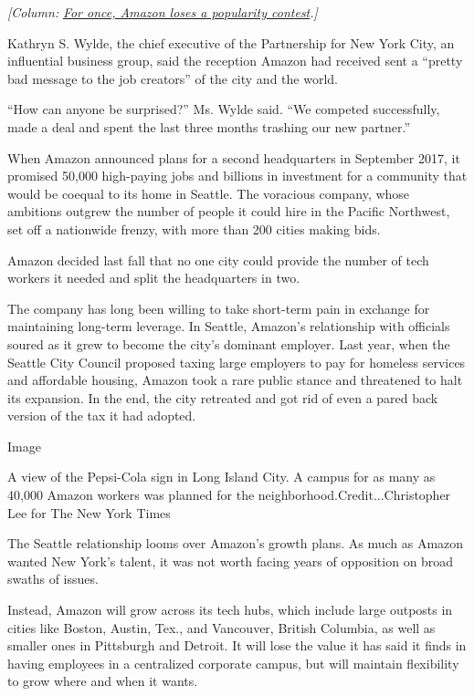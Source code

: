 \emph{{[}Column:}
\href{https://www.nytimes.com/2019/02/14/business/amazon-new-york-city.html}{\emph{For
once, Amazon loses a popularity contest}}\emph{.{]}}

Kathryn S. Wylde, the chief executive of the Partnership for New York
City, an influential business group, said the reception Amazon had
received sent a ``pretty bad message to the job creators'' of the city
and the world.

``How can anyone be surprised?'' Ms. Wylde said. ``We competed
successfully, made a deal and spent the last three months trashing our
new partner.''

When Amazon announced plans for a second headquarters in September 2017,
it promised 50,000 high-paying jobs and billions in investment for a
community that would be coequal to its home in Seattle. The voracious
company, whose ambitions outgrew the number of people it could hire in
the Pacific Northwest, set off a nationwide frenzy, with more than 200
cities making bids.

Amazon decided last fall that no one city could provide the number of
tech workers it needed and split the headquarters in two.

The company has long been willing to take short-term pain in exchange
for maintaining long-term leverage. In Seattle, Amazon's relationship
with officials soured as it grew to become the city's dominant employer.
Last year, when the Seattle City Council proposed taxing large employers
to pay for homeless services and affordable housing, Amazon took a rare
public stance and threatened to halt its expansion. In the end, the city
retreated and got rid of even a pared back version of the tax it had
adopted.

Image

A view of the Pepsi-Cola sign in Long Island City. A campus for as many
as 40,000 Amazon workers was planned for the
neighborhood.Credit...Christopher Lee for The New York Times

The Seattle relationship looms over Amazon's growth plans. As much as
Amazon wanted New York's talent, it was not worth facing years of
opposition on broad swaths of issues.

Instead, Amazon will grow across its tech hubs, which include large
outposts in cities like Boston, Austin, Tex., and Vancouver, British
Columbia, as well as smaller ones in Pittsburgh and Detroit. It will
lose the value it has said it finds in having employees in a centralized
corporate campus, but will maintain flexibility to grow where and when
it wants.


